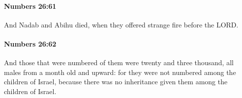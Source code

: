 		\paragraph{Numbers 26:61} %
			\label{NUMBERS-26-61}

			And Nadab and Abihu died, when they offered strange fire before the LORD.


		\paragraph{Numbers 26:62} %
			\label{NUMBERS-26-62}

			And those that were numbered of them were twenty and three thousand, all males from a month old and upward: for they were not numbered among the children of Israel, because there was no inheritance given them among the children of Israel.


